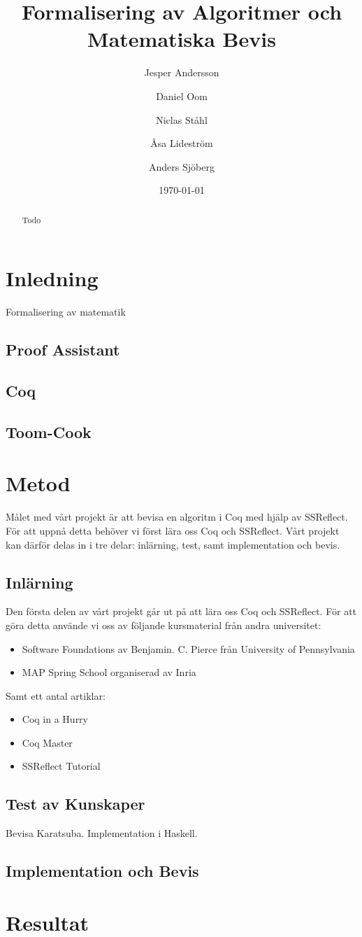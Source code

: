 \documentclass[a4paper]{article}
\title{Formalisering av Algoritmer och Matematiska Bevis}
\author[1]{Jesper Andersson}
\author[1]{Daniel Oom}
\author[1]{Niclas Ståhl}
\author[2]{Åsa Lideström}
\author[2]{Anders Sjöberg}
\affil[1]{Datateknik, Chalmers}
\affil[2]{Mattematik, Göteborgs Universitet}
\date{\today}
\begin{document}
\begin{abstract}
Todo
\end{abstract}

\maketitle
\thispagestyle{empty}
\newpage
\tableofcontents
\newpage

\section{Inledning}
Formalisering av matematik

\subsection{Proof Assistant}
\subsection{Coq}
\subsection{Toom-Cook}

\section{Metod}

Målet med vårt projekt är att bevisa en algoritm i Coq med hjälp av SSReflect.
För att uppnå detta behöver vi först lära oss Coq och SSReflect. Vårt projekt
kan därför delas in i tre delar: inlärning, test, samt implementation och
bevis.

\subsection{Inlärning}
Den första delen av vårt projekt går ut på att lära oss Coq och SSReflect. För
att göra detta använde vi oss av följande kursmaterial från andra universitet:
\begin{itemize}
  \item Software Foundations av Benjamin. C. Pierce från University of
    Pennsylvania
  \item MAP Spring School organiserad av Inria
\end{itemize}
Samt ett antal artiklar:
\begin{itemize}
  \item Coq in a Hurry
  \item Coq Master
  \item SSReflect Tutorial
\end{itemize}
\citet{bertot2006coq}

\subsection{Test av Kunskaper}
Bevisa Karatsuba. Implementation i Haskell.

\subsection{Implementation och Bevis}

\section{Resultat}



\nocite{*}
\end{document}

